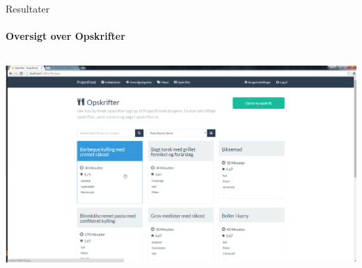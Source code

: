 \begin{frame}{Resultater}
\framesubtitle{Oversigt over Opskrifter}

	
	\begin{minipage}[0.3\textheight]{\textwidth}
	\begin{columns}[T]
	\begin{column}{1\textwidth}
	 \includegraphics[width=1\textwidth,height=1\textheight,keepaspectratio, trim={1cm 0 0 16mm}, clip]{images/Screenshots/Recipe.png}
	
	\end{column}

	\end{columns}

  \end{minipage}
	
\end{frame}

